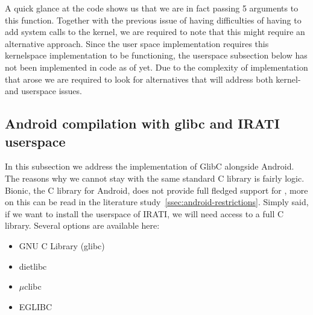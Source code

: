 A quick glance at the code shows us that we are in fact passing 5 arguments to this function. Together with the previous issue of having difficulties of having to add system calls to the kernel, we are required to note that this might require an alternative approach. Since the user space implementation requires this kernelspace implementation to be functioning, the userspace subsection below has not been implemented in code as of yet. Due to the complexity of implementation that arose we are required to look for alternatives that will address both kernel- and userspace issues.

\subsection{Android compilation with glibc and IRATI userspace}


In this subsection we address the implementation of GlibC alongside Android. The reasons why we cannot stay with the same standard C library is fairly logic. Bionic, the C library for Android, does not provide full fledged support for \cpp, more on this can be read in the literature study~\ref{ssec:android-restrictions}. Simply said, if we want to install the userspace of IRATI, we will need access to a full C library. Several options are available here:

\begin{itemize}
	\item GNU C Library (glibc)
	\item dietlibc
	\item $\mu$clibc
	\item EGLIBC
\end{itemize}

